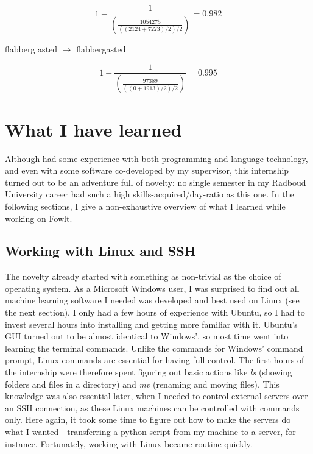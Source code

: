 \documentclass[12pt]{article}
\let\stdsection\section
\renewcommand\section{\newpage\stdsection}
\begin{document}
\[
1 - \frac{1}{(\frac{1054275}{((2124+7223)/2)/2})} = 0.982
\]

flabberg asted $\rightarrow$ flabbergasted

\[
1 - \frac{1}{(\frac{97389}{((0+1913)/2)/2})} = 0.995
\]


\section{What I have learned}
Although had some experience with both programming and language technology, and even with some software co-developed by my supervisor, this internship turned out to be an adventure full of novelty: no single semester in my Radboud University career had such a high skills-acquired/day-ratio as this one. In the following sections, I give a non-exhaustive overview of what I learned while working on Fowlt.

\subsection{Working with Linux and SSH}
The novelty already started with something as non-trivial as the choice of operating system. As a Microsoft Windows user, I was surprised to find out all machine learning software I needed was developed and best used on Linux (see the next section). I only had a few hours of experience with Ubuntu, so I had to invest several hours into installing and getting more familiar with it. Ubuntu's GUI turned out to be almost identical to Windows', so most time went into learning the terminal commands. Unlike the commands for Windows' command prompt, Linux commands are essential for having full control. The first hours of the internship were therefore spent figuring out basic actions like \emph{ls} (showing folders and files in a directory) and \emph{mv} (renaming and moving files). This knowledge was also essential later, when I needed to control external servers over an SSH connection, as these Linux machines can be controlled with commands only. Here again, it took some time to figure out how to make the servers do what I wanted - transferring a python script from my machine to a server, for instance. Fortunately, working with Linux became routine quickly.
\end{document}
